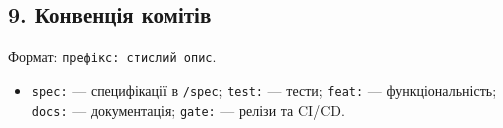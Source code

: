 \documentclass[
]{article}
\providecommand{\tightlist}{%
  \setlength{\itemsep}{0pt}\setlength{\parskip}{0pt}}
\begin{document}
\hypertarget{9-ux43aux43eux43dux432ux435ux43dux446ux456ux44f-ux43aux43eux43cux456ux442ux456ux432}{%
\subsection{9. Конвенція
комітів}\label{9-ux43aux43eux43dux432ux435ux43dux446ux456ux44f-ux43aux43eux43cux456ux442ux456ux432}}

Формат: \texttt{префікс:\ стислий\ опис}.

\begin{itemize}
\tightlist
\item
  \texttt{spec:} --- специфікації в \texttt{/spec}; \texttt{test:} ---
  тести; \texttt{feat:} --- функціональність; \texttt{docs:} ---
  документація; \texttt{gate:} --- релізи та CI/CD.
\end{itemize}
\end{document}
